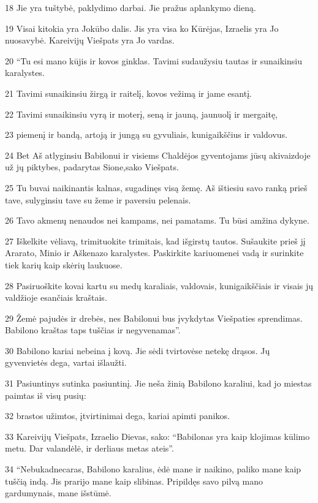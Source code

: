 \par 18 Jie yra tuštybė, paklydimo darbai. Jie pražus aplankymo dieną. 
\par 19 Visai kitokia yra Jokūbo dalis. Jis yra visa ko Kūrėjas, Izraelis yra Jo nuosavybė. Kareivijų Viešpats yra Jo vardas. 
\par 20 “Tu esi mano kūjis ir kovos ginklas. Tavimi sudaužysiu tautas ir sunaikinsiu karalystes. 
\par 21 Tavimi sunaikinsiu žirgą ir raitelį, kovos vežimą ir jame esantį. 
\par 22 Tavimi sunaikinsiu vyrą ir moterį, seną ir jauną, jaunuolį ir mergaitę, 
\par 23 piemenį ir bandą, artoją ir jungą su gyvuliais, kunigaikščius ir valdovus. 
\par 24 Bet Aš atlyginsiu Babilonui ir visiems Chaldėjos gyventojams jūsų akivaizdoje už jų piktybes, padarytas Sione,­sako Viešpats.­ 
\par 25 Tu buvai naikinantis kalnas, sugadinęs visą žemę. Aš ištiesiu savo ranką prieš tave, sulyginsiu tave su žeme ir paversiu pelenais. 
\par 26 Tavo akmenų nenaudos nei kampams, nei pamatams. Tu būsi amžina dykyne. 
\par 27 Iškelkite vėliavą, trimituokite trimitais, kad išgirstų tautos. Sušaukite prieš jį Ararato, Minio ir Aškenazo karalystes. Paskirkite kariuomenei vadą ir surinkite tiek karių kaip skėrių laukuose. 
\par 28 Pasiruoškite kovai kartu su medų karaliais, valdovais, kunigaikščiais ir visais jų valdžioje esančiais kraštais. 
\par 29 Žemė pajudės ir drebės, nes Babilonui bus įvykdytas Viešpaties sprendimas. Babilono kraštas taps tuščias ir negyvenamas”. 
\par 30 Babilono kariai nebeina į kovą. Jie sėdi tvirtovėse netekę drąsos. Jų gyvenvietės dega, vartai išlaužti. 
\par 31 Pasiuntinys sutinka pasiuntinį. Jie neša žinią Babilono karaliui, kad jo miestas paimtas iš visų pusių: 
\par 32 brastos užimtos, įtvirtinimai dega, kariai apimti panikos. 
\par 33 Kareivijų Viešpats, Izraelio Dievas, sako: “Babilonas yra kaip klojimas kūlimo metu. Dar valandėlė, ir derliaus metas ateis”. 
\par 34 “Nebukadnecaras, Babilono karalius, ėdė mane ir naikino, paliko mane kaip tuščią indą. Jis prarijo mane kaip slibinas. Pripildęs savo pilvą mano gardumynais, mane išstūmė. 
